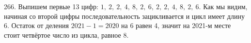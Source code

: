 266. Выпишем первые 13 цифр: $1,\ 2,\ 2,\ 4,\ 8,\ 2,\ 6,\ 2,\ 2,\ 4,\ 8,\ 2,\ 6.$ Как мы видим, начиная со второй цифры последовательность зацикливается и цикл имеет длину 6. Остаток от деления $2021-1=2020$ на 6 равен 4, значит на 2021-м месте стоит четвёртое число из цикла, равное 8.\\

